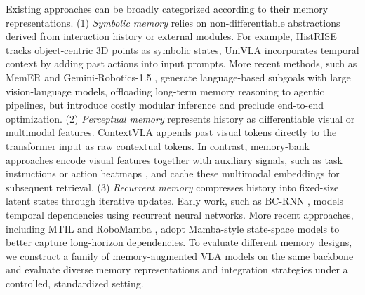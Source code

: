 Existing approaches can be broadly categorized according to their memory representations.
(1) \textit{Symbolic memory} relies on non-differentiable abstractions derived from interaction history or external modules. For example, HistRISE \cite{chen2025history} tracks object-centric 3D points as symbolic states,
UniVLA \cite{bu2025learning} incorporates temporal context by
adding past actions into input prompts.
More recent methods, such as MemER \cite{sridhar2025memer} and Gemini-Robotics-1.5 \cite{team2025geminirobot}, generate language-based subgoals with large vision-language models, offloading long-term memory reasoning to agentic pipelines, but introduce costly modular inference and preclude end-to-end optimization.
(2) \textit{Perceptual memory} represents history as differentiable visual or multimodal features. ContextVLA \cite{jang2025contextvla} appends past visual tokens directly to the transformer input as raw contextual tokens. In contrast, memory-bank approaches encode visual features together with auxiliary signals, such as task instructions \cite{shi2025memoryvla, koo2025hamlet} or action heatmaps \cite{fang2025sam2act}, and cache these multimodal embeddings for subsequent retrieval.
(3) \textit{Recurrent memory} compresses history into fixed-size latent states through iterative updates. Early work, such as BC-RNN \cite{mandlekar2021matters}, models temporal dependencies using recurrent neural networks. More recent approaches, including MTIL \cite{zhou2025mtil} and RoboMamba \cite{liu2024robomamba}, adopt Mamba-style state-space models \cite{gu2024mamba} to better capture long-horizon dependencies.
To evaluate different memory designs, we construct a family of memory-augmented VLA models on the same backbone and evaluate diverse memory representations and integration strategies under a controlled, standardized setting.
